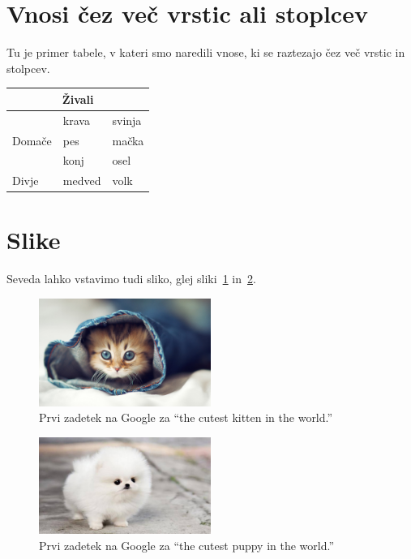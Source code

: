 \documentclass{article}
\begin{document}
\section{Vnosi čez več vrstic ali stoplcev}
\label{sec:vnosi-ez-ve}

Tu je primer tabele, v kateri smo naredili vnose, ki se raztezajo čez več vrstic in stolpcev.

\begin{center}
\begin{tabular}{lll}
  \toprule
  \multicolumn{3}{c}{Živali} \\ \midrule
  \multirow{3}{*}{Domače} & krava & svinja \\
                          & pes & mačka \\
                          & konj & osel \\
  Divje                   & medved & volk \\ \bottomrule
\end{tabular}
\end{center}

\section{Slike}
\label{sec:slike}

Seveda lahko vstavimo tudi sliko, glej sliki~\ref{fig:muca} in~\ref{fig:kuza}.

\begin{figure}
  \centering
  \includegraphics[width=0.5\textwidth]{muca.jpg}
  \caption{Prvi zadetek na Google za ``the cutest kitten in the world.''}
  \label{fig:muca}
\end{figure}

\begin{figure}[ht]
  \centering
  \includegraphics[width=0.5\textwidth]{kuza.jpg}
  \caption{Prvi zadetek na Google za ``the cutest puppy in the world.''}
  \label{fig:kuza}
\end{figure}
\end{document}
